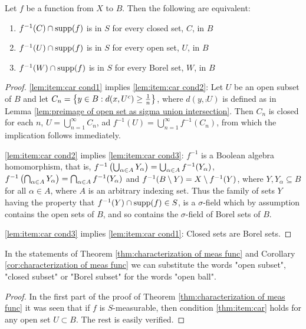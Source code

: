 \begin{lemma}
Let $f$ be a function from $X$ to $B$. Then the following are equivalent:
\begin{enumerate}[label=\arabic*),ref=\arabic*)]
    \item \label{lem:item:car cond1}
    $f^{-1}(C)\cap\operatorname{supp}(f)$ is in $S$ for every closed set, $C$, in $B$
    \item \label{lem:item:car cond2}
    $f^{-1}(U)\cap\operatorname{supp}(f)$ is in $S$ for every open set, $U$, in $B$
    \item \label{lem:item:car cond3}
    $f^{-1}(W)\cap\operatorname{supp}(f)$ is in $S$ for every Borel set, $W$, in $B$
\end{enumerate}
\end{lemma}
\begin{proof}
\ref{lem:item:car cond1} implies \ref{lem:item:car cond2}: Let $U$ be an open subset of $B$ and let $C_n=\left\{y\in B:d(x,{U}^c)\geq\frac1n\right\}$, where $d(y,\comp{U})$ is defined as in Lemma \ref{lem:preimage of open set as sigma union intersection}. Then $C_n$ is closed for each $n$, $U=\bigcup_{n=1}^\infty C_n$, ad $f^{-1}(U)=\bigcup_{n=1}^\infty f^{-1}(C_n)$, from which the implication follows immediately.

\ref{lem:item:car cond2} implies \ref{lem:item:car cond3}: $f^{-1}$ is a Boolean algebra homomorphism, that is, $f^{-1}\left(\bigcup_{\alpha\in A}Y_\alpha\right)=\bigcup_{\alpha\in A}f^{-1}(Y_\alpha)$, $f^{-1}\left(\bigcap_{\alpha\in A}Y_\alpha\right)=\bigcap_{\alpha\in A}f^{-1}(Y_\alpha)$ and $f^{-1}(B\setminus Y)=X\setminus f^{-1}(Y)$, where $Y,Y_\alpha\subseteq B$ for all $\alpha\in A$, where $A$ is an arbitrary indexing set. Thus the family of sets $Y$ having the property that $f^{-1}(Y)\cap\operatorname{supp}(f)\in S$, is a $\sigma$-field which by assumption contains the open sets of $B$, and so contains the $\sigma$-field of Borel sets of $B$.

\ref{lem:item:car cond3} implies \ref{lem:item:car cond1}: Closed sets are Borel sets.
\end{proof}

\begin{corollary}
In the statements of Theorem \ref{thm:characterization of meas func} and Corollary \ref{cor:characterization of meas func} we can substitute the words "open subset", "closed subset" or "Borel subset" for the words "open ball".
\end{corollary}

\begin{proof}
In the first part of the proof of Theorem \ref{thm:characterization of meas func} it was seen that if $f$ is $S$-measurable, then condition \ref{thm:item:car} holds for any open set $U \subset B$. The rest is easily verified.
\end{proof}

